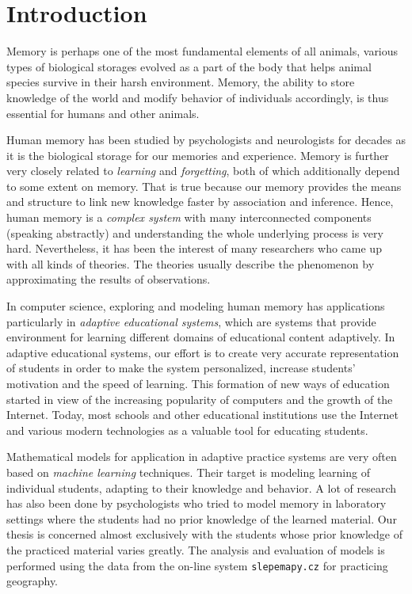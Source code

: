 \chapter{Introduction}

Memory is perhaps one of the most fundamental elements of all animals, various types of biological storages evolved as a part of the body that helps animal species survive in their harsh environment. Memory, the ability to store knowledge of the world and modify behavior of individuals accordingly, is thus essential for humans and other animals.

Human memory has been studied by psychologists and neurologists for decades as it is the biological storage for our memories and experience. Memory is further very closely related to \textit{learning} and \textit{forgetting}, both of which additionally depend to some extent on memory. That is true because our memory provides the means and structure to link new knowledge faster by association and inference. Hence, human memory is a \textit{complex system} with many interconnected components (speaking abstractly) and understanding the whole underlying process is very hard. Nevertheless, it has been the interest of many researchers who came up with all kinds of theories. The theories usually describe the phenomenon by approximating the results of observations.

In computer science, exploring and modeling human memory has applications particularly in \textit{adaptive educational systems}, which are systems that provide environment for learning different domains of educational content adaptively. In adaptive educational systems, our effort is to create very accurate representation of students in order to make the system personalized, increase students' motivation and the speed of learning. This formation of new ways of education started in view of the increasing popularity of computers and the growth of the Internet. Today, most schools and other educational institutions use the Internet and various modern technologies as a valuable tool for educating students.

Mathematical models for application in adaptive practice systems are very often based on \textit{machine learning} techniques. Their target is modeling learning of individual students, adapting to their knowledge and behavior. A lot of research has also been done by psychologists who tried to model memory in laboratory settings where the students had no prior knowledge of the learned material. Our thesis is concerned almost exclusively with the students whose prior knowledge of the practiced material varies greatly. The analysis and evaluation of models is performed using the data from the on-line system \texttt{slepemapy.cz} for practicing geography.
